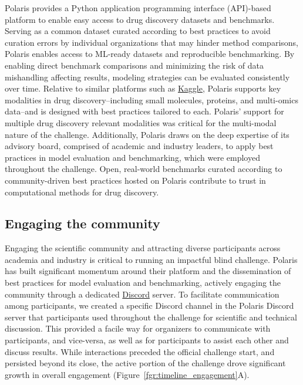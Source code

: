 \documentclass[journal=jcim,manuscript=article]{achemso}
\begin{document}
 Polaris provides a Python application programming interface (API)-based platform to enable easy access to drug discovery datasets and benchmarks. Serving as a common dataset curated according to best practices to avoid curation errors by individual organizations that may hinder method comparisons, Polaris enables access to ML-ready datasets and reproducible benchmarking\cite{Polaris_website, wognum_call_2024}. By enabling direct benchmark comparisons and minimizing the risk of data mishandling affecting results, modeling strategies can be evaluated consistently over time. Relative to similar platforms such as \href{kaggle.com}{Kaggle}, Polaris supports key modalities in drug discovery--including small molecules, proteins, and multi-omics data--and is designed with best practices tailored to each. Polaris' support for multiple drug discovery relevant modalities was critical for the multi-modal nature of the challenge.  Additionally, Polaris draws on the deep expertise of its advisory board, comprised of academic and industry leaders, to apply best practices in model evaluation and benchmarking\cite{ash_practically_2024}, which were employed throughout the challenge. Open, real-world benchmarks curated according to community-driven best practices hosted on Polaris contribute to trust in computational methods for drug discovery.

\subsection{Engaging the community}

Engaging the scientific community and attracting diverse participants across academia and industry is critical to running an impactful blind challenge. Polaris has built significant momentum around their platform and the dissemination of best practices for model evaluation and benchmarking\cite{wognum_call_2024}, actively engaging the community through a dedicated \href{discord.com}{Discord} server. To facilitate communication among participants, we created a specific Discord channel in the Polaris Discord server that participants used throughout the challenge for scientific and technical discussion. This provided a facile way for organizers to communicate with participants, and vice-versa, as well as for participants to assist each other and discuss results. While interactions preceded the official challenge start, and persisted beyond its close, the active portion of the challenge drove significant growth in overall engagement (Figure~\ref{fgr:timeline_engagement}A).
\end{document}
